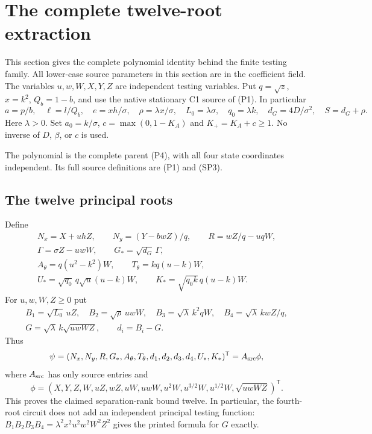 \section{The complete twelve-root extraction}
\label{sec:explicit-twelve-roots}

This section gives the complete polynomial identity behind the finite
testing family. All lower-case source parameters in this section are in
the coefficient field. The variables $u,w,W,X,Y,Z$ are independent
testing variables. Put $q=\sqrt z$, $x=k^2$, $Q_b=1-b$, and use the
native stationary C1 source of (P1). In particular
\[
 a=p/b,\quad \ell=l/Q_b,\quad e=xh/\sigma,\quad
 \rho=\lambda x/\sigma,\quad L_0=\lambda\sigma,\quad
 q_0=\lambda k,\quad d_G=4D/\sigma^2,\quad S=d_G+\rho.
\]
Here $\lambda>0$. Set $a_0=k/\sigma$, $c=\max(0,1-K_A)$ and
$K_+=K_A+c\ge1$. No inverse of $D$, $\beta$, or $c$ is used.

The polynomial is the complete parent (P4), with all four state
coordinates independent. Its full source definitions are (P1) and (SP3).


\subsection{The twelve principal roots}

Define
\[
\begin{gathered}
 N_x=X+uhZ,\qquad N_y=(Y-bwZ)/q,\qquad R=wZ/q-uqW,\\
 \Gamma=\sigma Z-uwW,\qquad G_* =\sqrt{d_G}\,\Gamma,\\
 A_\theta=q(u^2-k^2)W,\qquad T_\theta=kq(u-k)W,\\
 U_* =\sqrt{q_0}\,q\sqrt u(u-k)W,\qquad
 K_* =\sqrt{q_0k}\,q(u-k)W.
\end{gathered}
\]
For $u,w,W,Z\ge0$ put
\[
\begin{gathered}
 B_1=\sqrt{L_0}\,uZ,\quad B_2=\sqrt\rho\,uwW,\quad
 B_3=\sqrt\lambda\,k^2qW,\quad B_4=\sqrt\lambda\,kwZ/q,\\
 G=\sqrt\lambda\,k\sqrt{uwWZ},\qquad d_i=B_i-G.
\end{gathered}
\]
Thus
\[
 \psi=(N_x,N_y,R,G_*,A_\theta,T_\theta,d_1,d_2,d_3,d_4,U_*,K_*)^{\mathsf T}
       =A_{\rm src}\phi,
\]
where $A_{\rm src}$ has only source entries and
\[
 \phi=(X,Y,Z,W,uZ,wZ,uW,uwW,u^2W,u^{3/2}W,u^{1/2}W,
             \sqrt{uwWZ})^{\mathsf T}.
\]
This proves the claimed separation-rank bound twelve. In particular,
the fourth-root circuit does not add an independent principal testing
function: $B_1B_2B_3B_4=\lambda^2x^2u^2w^2W^2Z^2$ gives the printed
formula for $G$ exactly.

